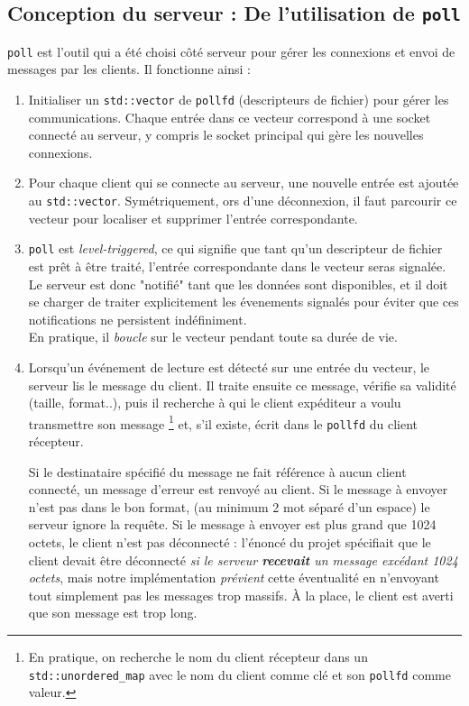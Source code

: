 \documentclass{article}
\begin{document}
\subsection{Conception du serveur : De l'utilisation de \texttt{poll}}
\noindent \texttt{poll} \cite{poll} est l'outil qui a été choisi côté serveur pour gérer les connexions et envoi de messages par les clients. Il fonctionne ainsi \cite{poll} :
\begin{enumerate}
    \item Initialiser un \texttt{std::vector} de \texttt{pollfd} (descripteurs de fichier) pour gérer les communications. Chaque entrée dans ce vecteur correspond à une socket connecté au serveur, y compris le socket principal qui gère les nouvelles connexions.
    \item Pour chaque client qui se connecte au serveur, une nouvelle entrée  est ajoutée au \texttt{std::vector}. Symétriquement, ors d'une déconnexion, il faut parcourir ce vecteur pour localiser et supprimer l'entrée correspondante.
    \item \texttt{poll} est \textit{level-triggered}, ce qui signifie que tant qu'un descripteur de fichier est prêt à être traité, l'entrée correspondante dans le vecteur seras signalée. Le serveur est donc "notifié" tant que les données sont disponibles, \cite{LevelEdgeTrigger} \cite{PollTrigger} et il doit se charger de traiter explicitement les évenements signalés pour éviter que ces notifications ne persistent indéfiniment.\\ En pratique, il \textit{boucle} sur le vecteur pendant toute sa durée de vie.
    \item Lorsqu’un événement de lecture est détecté sur une entrée du vecteur, le serveur lis le message du client. Il traite ensuite ce message, vérifie sa validité (taille, format..), puis il recherche à qui le client expéditeur a voulu transmettre son message \footnote{En pratique, on recherche le nom du client récepteur dans un \texttt{std::unordered\_map} avec le nom du client comme clé et son \texttt{pollfd} comme valeur.} et, s'il existe, écrit dans le \texttt{pollfd} du client récepteur.


    Si le destinataire spécifié du message ne fait référence à aucun client connecté, un message d'erreur est renvoyé au client.
    Si le message à envoyer n'est pas dans le bon format, (au minimum 2 mot séparé d'un espace) le serveur ignore la requête.
    Si le message à envoyer est plus grand que 1024 octets, le client n'est pas déconnecté : l'énoncé du projet spécifiait que le client devait être déconnecté \textit{si le serveur \textbf{recevait} un message excédant 1024 octets}, mais notre implémentation \textit{prévient} cette éventualité en n'envoyant tout simplement pas les messages trop massifs. À la place, le client est averti que son message est trop long.
\end{enumerate}
\end{document}
